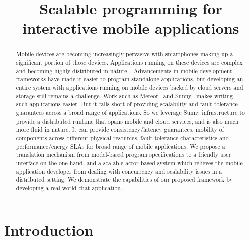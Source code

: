 \documentclass[a4paper]{article}
\begin{document}
\title{Scalable programming for interactive mobile applications}
\predate{}
\date{}
\postdate{}

\maketitle

\begin{abstract}
Mobile devices are becoming increasingly pervasive with smartphones making up a significant portion of those devices. Applications running on these devices are complex and becoming highly distributed in nature~\cite{7879258}. Advancements in mobile development frameworks have made it easier to program standalone applications, but developing an entire system with applications running on mobile devices backed by cloud servers and storage still remains a challenge. Work such as Meteor~\cite{Meteor} and Sunny~\cite{Milicevic} makes writing such applications easier. But it falls short of providing scalability and fault tolerance guarantees across a broad range of applications. So we leverage Sunny infrastructure to provide a distributed runtime that spans mobile and cloud services, and is also much more fluid in nature. It can provide consistency/latency guarantees, mobility of components across different physical resources, fault tolerance characteristics and performance/energy SLAs for broad range of mobile applications. We propose a translation mechanism from model-based program specifications to a friendly user interface on the one hand, and a scalable actor based system which relieves the mobile application developer from dealing with concurrency and scalability issues in a distributed setting. We demonstrate the capabilities of our proposed framework by developing a real world chat application. 
\end{abstract}

\section{Introduction}
\end{document}
